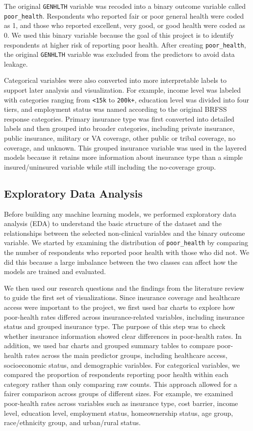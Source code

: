 The original \texttt{GENHLTH} variable was recoded into a binary outcome variable called \texttt{poor\_health}. Respondents who reported fair or poor general health were coded as 1, and those who reported excellent, very good, or good health were coded as 0. We used this binary variable because the goal of this project is to identify respondents at higher risk of reporting poor health. After creating \texttt{poor\_health}, the original \texttt{GENHLTH} variable was excluded from the predictors to avoid data leakage.

Categorical variables were also converted into more interpretable labels to support later analysis and visualization. For example, income level was labeled with categories ranging from \texttt{<15k} to \texttt{200k+}, education level was divided into four tiers, and employment status was named according to the original BRFSS response categories. Primary insurance type was first converted into detailed labels and then grouped into broader categories, including private insurance, public insurance, military or VA coverage, other public or tribal coverage, no coverage, and unknown. This grouped insurance variable was used in the layered models because it retains more information about insurance type than a simple insured/uninsured variable while still including the no-coverage group.

\subsection{Exploratory Data Analysis}
Before building any machine learning models, we performed exploratory data analysis (EDA) to understand the basic structure of the dataset and the relationships between the selected non-clinical variables and the binary outcome variable. We started by examining the distribution of \texttt{poor\_health} by comparing the number of respondents who reported poor health with those who did not. We did this because a large imbalance between the two classes can affect how the models are trained and evaluated.

We then used our research questions and the findings from the literature review to guide the first set of visualizations. Since insurance coverage and healthcare access were important to the project, we first used bar charts to explore how poor-health rates differed across insurance-related variables, including insurance status and grouped insurance type. The purpose of this step was to check whether insurance information showed clear differences in poor-health rates. In addition, we used bar charts and grouped summary tables to compare poor-health rates across the main predictor groups, including healthcare access, socioeconomic status, and demographic variables. For categorical variables, we compared the proportion of respondents reporting poor health within each category rather than only comparing raw counts. This approach allowed for a fairer comparison across groups of different sizes. For example, we examined poor-health rates across variables such as insurance type, cost barrier, income level, education level, employment status, homeownership status, age group, race/ethnicity group, and urban/rural status.


